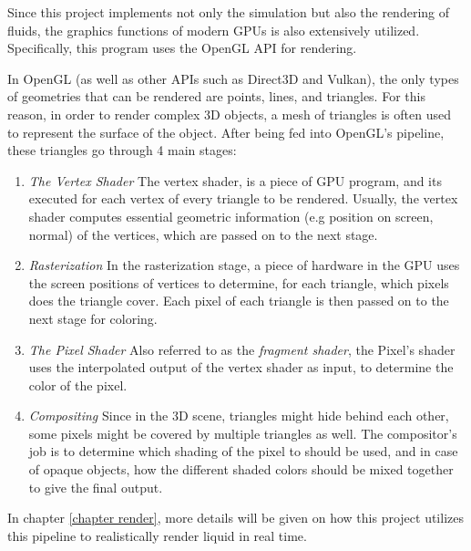 Since this project implements not only the simulation but also the rendering of fluids, the graphics functions of modern GPUs is also extensively utilized. Specifically, this program uses the OpenGL API for rendering.

In OpenGL (as well as other APIs such as Direct3D and Vulkan), the only types of geometries that can be rendered are points, lines, and triangles. For this reason, in order to render complex 3D objects, a mesh of triangles is often used to represent the surface of the object. After being fed into OpenGL's pipeline, these triangles go through 4 main stages:
\begin{enumerate}
    \item 
    \textit{The Vertex Shader}
    The vertex shader, is a piece of GPU program, and its executed for each vertex of every triangle to be rendered. Usually, the vertex shader computes essential geometric information (e.g position on screen, normal) of the vertices, which are passed on to the next stage.
    
    \item 
    \textit{Rasterization}
    In the rasterization stage, a piece of hardware in the GPU uses the screen positions of vertices to determine, for each triangle, which pixels does the triangle cover. Each pixel of each triangle is then passed on to the next stage for coloring.
    
    \item
    \textit{The Pixel Shader}
    Also referred to as the \textit{fragment shader}, the Pixel's shader uses the interpolated output of the vertex shader as input, to determine the color of the pixel. 

    \item 
    \textit{Compositing}
    Since in the 3D scene, triangles might hide behind each other, some pixels might be covered by multiple triangles as well. The compositor's job is to determine which shading of the pixel to should be used, and in case of opaque objects, how the different shaded colors should be mixed together to give the final output.
    
\end{enumerate}

In chapter \ref{chapter render}, more details will be given on how this project utilizes this pipeline to realistically render liquid in real time.